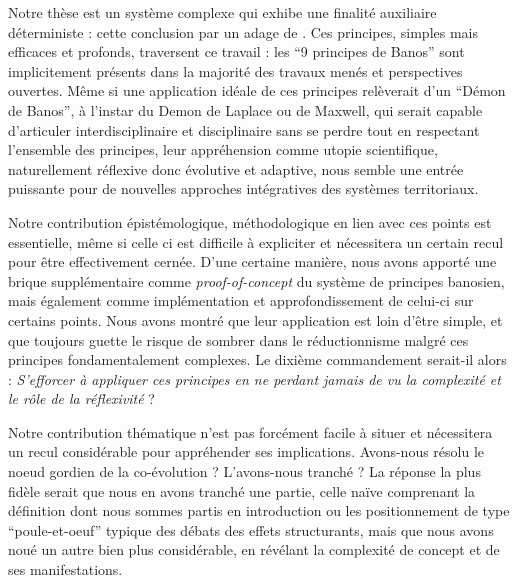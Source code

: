 


Notre thèse est un système complexe qui exhibe une finalité auxiliaire déterministe : cette conclusion par un adage de . Ces principes, simples mais efficaces et profonds, traversent ce travail : les ``9 principes de Banos'' sont implicitement présents dans la majorité des travaux menés et perspectives ouvertes. Même si une application idéale de ces principes relèverait d'un ``Démon de Banos'', à l'instar du Demon de Laplace ou de Maxwell, qui serait capable d'articuler interdisciplinaire et disciplinaire sans se perdre tout en respectant l'ensemble des principes, leur appréhension comme utopie scientifique, naturellement réflexive donc évolutive et adaptive, nous semble une entrée puissante pour de nouvelles approches intégratives des systèmes territoriaux. 


Notre contribution épistémologique, méthodologique en lien avec ces points est essentielle, même si celle ci est difficile à expliciter et nécessitera un certain recul pour être effectivement cernée. D'une certaine manière, nous avons apporté une brique supplémentaire comme \emph{proof-of-concept} du système de principes banosien, mais également comme implémentation et approfondissement de celui-ci sur certains points. Nous avons montré que leur application est loin d'être simple, et que toujours guette le risque de sombrer dans le réductionnisme malgré ces principes fondamentalement complexes. Le dixième commandement serait-il alors : \textit{S'efforcer à appliquer ces principes en ne perdant jamais de vu la complexité et le rôle de la réflexivité} ?


Notre contribution thématique n'est pas forcément facile à situer et nécessitera un recul considérable pour appréhender ses implications. Avons-nous résolu le noeud gordien de la co-évolution ? L'avons-nous tranché ? La réponse la plus fidèle serait que nous en avons tranché une partie, celle naïve comprenant la définition dont nous sommes partis en introduction ou les positionnement de type ``poule-et-oeuf'' typique des débats des effets structurants, mais que nous avons noué un autre bien plus considérable, en révélant la complexité de concept et de ses manifestations.


